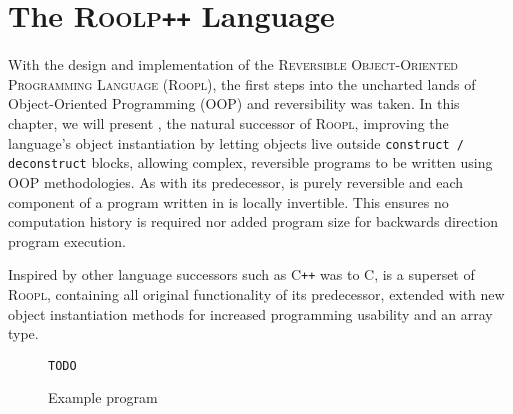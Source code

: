 \chapter{The \textsc{Roolp\texttt{++}} Language}
\label{chp:rooplpp}
With the design and implementation of the \textsc{Reversible Object-Oriented Programming Language} (\textsc{Roopl}), the first steps into the uncharted lands of Object-Oriented Programming (OOP) and reversibility was taken. In this chapter, we will present \rooplpp, the natural successor of \textsc{Roopl}, improving the language's object instantiation by letting objects live outside \texttt{construct / deconstruct} blocks, allowing complex, reversible programs to be written using OOP methodologies. As with its predecessor, \rooplpp is purely reversible and each component of a program written in \rooplpp is locally invertible. This ensures no computation history is required nor added program size for backwards direction program execution.

Inspired by other language successors such as \textsc{C\texttt{++}} was to \textsc{C}, \rooplpp is a superset of \textsc{Roopl}, containing all original functionality of its predecessor, extended with new object instantiation methods for increased programming usability and an array type.

\begin{figure}
    \texttt{TODO}
    \caption{Example \rooplpp program}   
\end{figure}
\newpage

